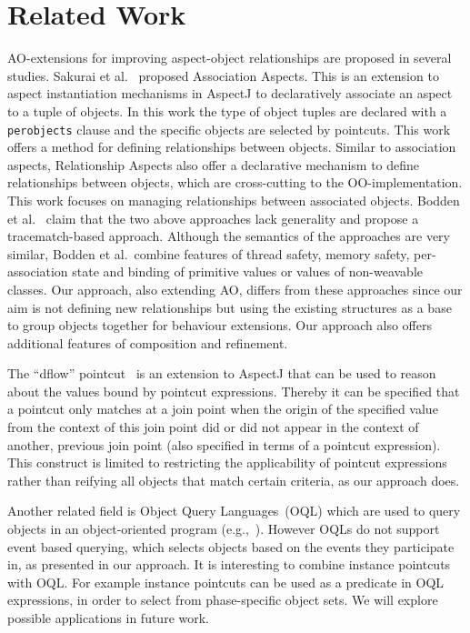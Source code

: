 \documentclass{acm_proc_article-sp}
\newcommand{\lstinln}[1]{\lstinline~#1~}
\begin{document}
\section{Related Work}
AO-extensions for improving aspect-object relationships are proposed in several studies. Sakurai et al.~\cite{sakurai2004association} proposed Association Aspects. This is an extension to aspect instantiation mechanisms in AspectJ to declaratively associate an aspect to a tuple of objects. In this work the type of object tuples are declared with a \lstinln{perobjects} clause and the specific objects are selected by pointcuts. This work offers a method for defining relationships between objects. Similar to association aspects, Relationship Aspects \cite{pearce2006relationship} also offer a declarative mechanism to define relationships between objects, which are cross-cutting to the OO-implementation. This work focuses on managing relationships between associated objects. Bodden et al.~\cite{bodden2008relational} claim that the two above approaches lack generality and propose a tracematch-based approach. Although the semantics of the approaches are very similar, Bodden et al.\ combine features of thread safety, memory safety, per-association state and binding of primitive values or values of non-weavable classes. Our approach, also extending AO, differs from these approaches since our aim is not defining new relationships but using the existing structures as a base to group objects together for behaviour extensions. Our approach also offers additional features of composition and refinement.

The ``dflow'' pointcut~\cite{kawauchi:aosd-aosdsec04} is an extension to AspectJ that can be used to reason about the values bound by pointcut expressions. Thereby it can be specified that a pointcut only matches at a join point when the origin of the specified value from the context of this join point did or did not appear in the context of another, previous join point (also specified in terms of a pointcut expression). This construct is limited to restricting the applicability of pointcut expressions rather than reifying all objects that match certain criteria, as our approach does.

Another related field is Object Query Languages~(OQL) which are used to query objects in an object-oriented program (e.g.,~\cite{cluet1998designing}). However OQLs do not support event based querying, which selects objects based on the events they participate in, as presented in our approach. It is interesting to combine instance pointcuts with OQL. For example instance pointcuts can be used as a predicate in OQL expressions, in order to select from phase-specific object sets. We will explore possible applications in future work. 
\end{document}
